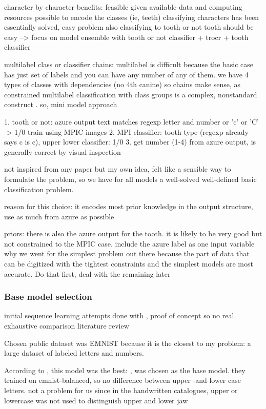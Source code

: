 \documentclass{article}
\begin{document}
character by character benefits: feasible given available data and computing resources
possible to encode the classes (ie, teeth)
classifying characters has been essentially solved, easy problem 
also classifying to tooth or not tooth should be easy 
--> focus on model ensemble with tooth or not classifier + trocr + tooth classifier

multilabel class or classifier chains:
multilabel is difficult because the basic case has just set of labels and you can 
have any number of any of them. we have 4 types of classes with dependencies (no 4th canine)
so chains make sense, as constrained multilabel classification with class groups is a 
complex, nonstandard construct \cite{multilabel_classification}. so, mini model approach 

1. tooth or not: azure output text matches regexp letter and number or 'c' or 'C' -> 1/0 train using MPIC images
2. MPI classifier: tooth type (regexp already says c is c), upper lower classifier: 1/0
3. get number (1-4) from azure output, is generally correct by visual inspection

not inspired from any paper but my own idea, felt like a sensible way to formulate the problem, 
so we have for all models a well-solved well-defined basic classification problem.

reason for this choice: it encodes most prior knowledge in the output structure,
use as much from azure as possible

priors:
there is also the azure output for the tooth. it is likely to be very good but not constrained to the MPIC case.
include the azure label as one input variable
why we went for the simplest problem out there
because the part of data that can be digitized with the tightest constraints and the simplest models are most accurate. Do that first, deal with the remaining later
\subsubsection{Base model selection}

initial sequence learning attempts done with \cite{li2021trocr}, proof of concept so no real exhaustive comparison literature review

Chosen public dataset was EMNIST \cite{emnist} because it is the closest to my problem: a large dataset of labeled letters and numbers.

According to \cite{emnistclassifiersurvey}, this model was the best: \cite{jamilemnist}, was chosen as the base model.
they trained on emnist-balanced, so no difference between upper -and lower case letters. not a problem for us since 
in the handwritten catalogues, upper or lowercase was not used to distinguish upper and lower jaw
\end{document}
